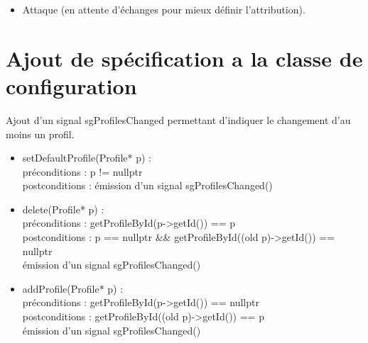 \documentclass{../../res/CR-projet}
\begin{document}
\begin{itemize}
  \item Attaque (en attente d'échanges pour mieux définir l'attribution).
\end{itemize}

\section{Ajout de spécification a la classe de configuration}


Ajout d'un signal sgProfilesChanged
permettant d'indiquer le changement d'au moins un profil.

\begin{itemize}
  \item 
setDefaultProfile(Profile* p) :\\
préconditions : p != nullptr\\
postconditions : émission d'un signal sgProfilesChanged()
  \item
delete(Profile* p) :\\
préconditions : getProfileById(p->getId()) == p\\
postconditions : p == nullptr \&\& getProfileById((old p)->getId()) == nullptr\\
                 émission d'un signal sgProfilesChanged()
  \item
addProfile(Profile* p) :\\
préconditions : getProfileById(p->getId()) == nullptr\\
postconditions : getProfileById((old p)->getId()) == p\\
                 émission d'un signal sgProfilesChanged()
\end{itemize}
\end{document}

